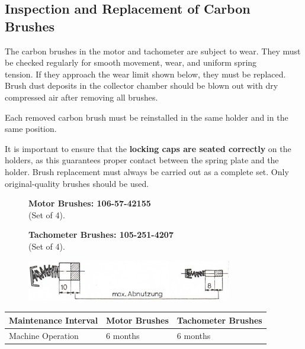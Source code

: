 
\newpage

\subsection*{Inspection and Replacement of Carbon Brushes}

The carbon brushes in the motor and tachometer are subject to wear.  
They must be checked regularly for smooth movement, wear, and uniform spring\\ tension.  
If they approach the wear limit shown below, they must be replaced.
Brush dust deposits in the collector chamber should be blown out with dry compressed air  
after removing all brushes.

Each removed carbon brush must be reinstalled in the same holder and in the same position.

It is important to ensure that the \textbf{locking caps are seated correctly} on the holders,  
as this guarantees proper contact between the spring plate and the holder.  
Brush replacement must always be carried out as a complete set.  
Only original-quality brushes should be used.


\begin{figure}[H]
    \centering
    \begin{minipage}{0.48\textwidth}
        \textbf{Motor Brushes: 106-57-42155} \\(Set of 4).  
    \end{minipage}
    \hfill
    \begin{minipage}{0.48\textwidth}
        \textbf{Tachometer Brushes: 105-251-4207} \\(Set of 4).  
    \end{minipage}

    \vspace{3pt} %

    \includegraphics[width=0.8\textwidth]{images/chapter7/carbon_brushes_wear_limit.jpg}
    \label{fig:carbon_brushes_wear_limit}
\end{figure}

\begin{table}[H]
    \centering
    \renewcommand{\arraystretch}{1.2}
    \begin{tabular}{|p{}|p{}|p{}|}
        \hline
        \textbf{Maintenance Interval} & \textbf{Motor Brushes} & \textbf{Tachometer Brushes} \\
        \hline
        Machine Operation & 6 months & 6 months \\
        \hline
    \end{tabular}
\end{table}

